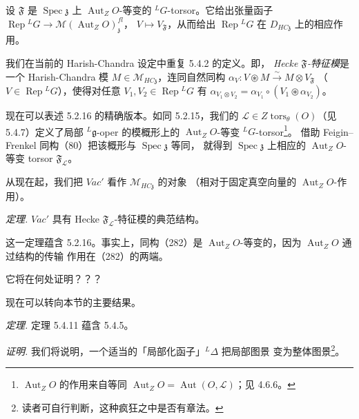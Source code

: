 设 $\mathfrak{F}$ 是 $\operatorname{Spec}\mathfrak{z}$ 上
$\operatorname{Aut}_ZO$-等变的 ${}^{L}G$-torsor。它给出张量函子
$\operatorname{Rep}{}^{L}G\to\mathcal{M}(\operatorname{Aut}_ZO)^{fl}_{\mathfrak{z}}$，
$V\mapsto V_{\mathfrak{F}}$，从而给出 $\operatorname{Rep}{}^{L}G$ 在
$D_{HC\mathfrak{z}}$ 上的相应作用。

 我们在当前的 Harish-Chandra 设定中重复 5.4.2 的定义。即，
\emph{Hecke $\mathfrak{F}$-特征模}是一个 Harish-Chandra 模
$M\in\mathcal{M}_{HC\mathfrak{z}}$，连同自然同构
$\alpha_V:V\circledast M\xrightarrow{\sim}M\otimes V_{\mathfrak{F}}$
（$V\in\operatorname{Rep}{}^{L}G$），使得对任意
$V_1,V_2\in\operatorname{Rep}{}^{L}G$ 有
$\alpha_{V_1\otimes V_2}=\alpha_{V_1}\circ(V_1\circledast\alpha_{V_2})$。

现在可以表述 5.2.16 的精确版本。如同 5.2.15，我们的
$\mathcal{L}\in Z\operatorname{tors}_{\theta}(O)$（见 5.4.7）定义了局部
${}^{L}\mathfrak{g}$-oper 的模概形上的 $\operatorname{Aut}_ZO$-等变
${}^{L}G$-torsor\footnote{$\operatorname{Aut}_ZO$ 的作用来自等同
$\operatorname{Aut}_ZO=\operatorname{Aut}(O,\mathcal{L})$；见 4.6.6。}。
借助 Feigin--Frenkel 同构（80）把该概形与 $\operatorname{Spec}\mathfrak{z}$ 等同，
就得到 $\operatorname{Spec}\mathfrak{z}$ 上相应的
$\operatorname{Aut}_ZO$-等变 torsor $\mathfrak{F}_{\mathcal{L}}$。


从现在起，我们把 $\mathit{Vac}'$ 看作 $\mathcal{M}_{HC\mathfrak{z}}$ 的对象
（相对于固定真空向量的 $\operatorname{Aut}_ZO$-作用）。

 \emph{定理.} $\mathit{Vac}'$ 具有 Hecke
$\mathfrak{F}_{\mathcal{L}}$-特征模的典范结构。

这一定理蕴含 5.2.16。事实上，同构（282）是
$\operatorname{Aut}_ZO$-等变的，因为 $\operatorname{Aut}_ZO$ 通过结构的传输
作用在（282）的两端。

它将在何处证明？？？

现在可以转向本节的主要结果。

 \emph{定理.} 定理 5.4.11 蕴含 5.4.5。

\emph{证明.} 我们将说明，一个适当的「局部化函子」${}^{L}\Delta$ 把局部图景
变为整体图景\footnote{读者可自行判断，这种疯狂之中是否有章法。}。

